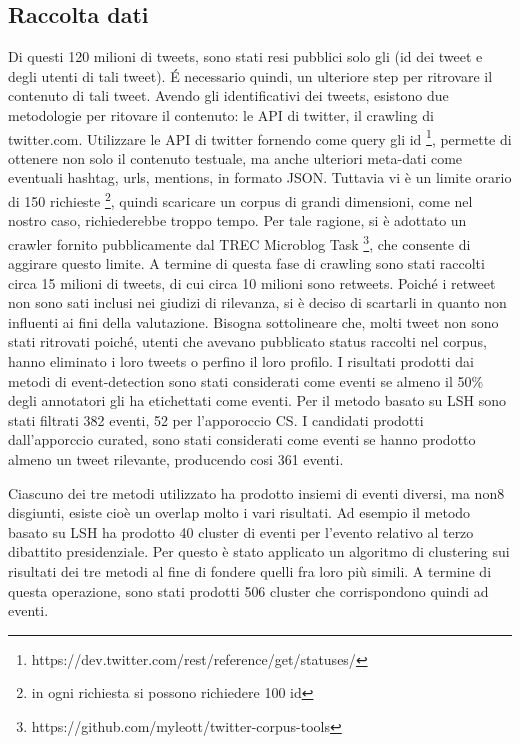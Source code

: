 \subsection{Raccolta dati}
Di questi 120 milioni di tweets, sono stati resi pubblici solo gli (id dei tweet e degli utenti di tali tweet).  \'E necessario quindi, un ulteriore step per ritrovare il contenuto di tali tweet.
Avendo gli identificativi dei tweets, esistono due metodologie per ritovare il contenuto: le API di twitter, il crawling di twitter.com.
Utilizzare le API di twitter fornendo come query gli id \footnote{https://dev.twitter.com/rest/reference/get/statuses/}, permette di ottenere non solo il contenuto testuale, ma anche ulteriori meta-dati come eventuali hashtag, urls, mentions, in formato JSON.
Tuttavia vi è un limite orario di 150 richieste \footnote{in ogni richiesta si possono richiedere 100 id}, quindi scaricare un corpus di grandi dimensioni, come nel nostro caso, richiederebbe troppo tempo. Per tale ragione, si è adottato un crawler fornito pubblicamente dal TREC Microblog Task \footnote{https://github.com/myleott/twitter-corpus-tools}, che consente di aggirare questo limite. A termine di questa fase di crawling sono stati raccolti circa 15 milioni di tweets, di cui  circa 10 milioni  sono retweets. Poiché i retweet non sono sati inclusi nei giudizi di rilevanza, si è deciso di scartarli in quanto non influenti ai fini della valutazione. Bisogna sottolineare che,  molti tweet non sono stati ritrovati poiché, utenti che avevano pubblicato status raccolti nel corpus, hanno eliminato i loro tweets o perfino il loro profilo.
 I risultati prodotti dai metodi di event-detection sono stati considerati come eventi
 se almeno il 50\% degli annotatori gli ha etichettati come eventi. Per il metodo basato su LSH sono stati filtrati 382 eventi, 52 per l'apporoccio CS.
 I candidati prodotti dall'apporccio curated, sono stati considerati come eventi se hanno prodotto almeno un tweet rilevante, producendo cosi 361 eventi.
 
 
 Ciascuno dei tre metodi utilizzato ha prodotto insiemi di eventi diversi, ma non8 disgiunti, esiste cioè   un overlap molto i vari risultati. Ad esempio il metodo basato su LSH ha prodotto 40 cluster di eventi per l'evento relativo al terzo dibattito presidenziale.
 Per questo è stato applicato un algoritmo di clustering sui risultati dei tre metodi al fine di fondere quelli fra loro più simili. A termine di questa operazione, sono stati prodotti 506 cluster che corrispondono quindi ad eventi.
 

 